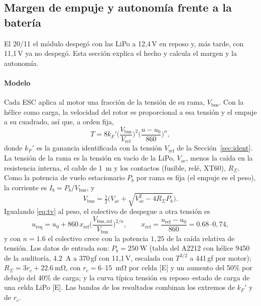 \subsection{Margen de empuje y autonomía frente a la batería}
\label{sec:bateria}

El 20/11 el módulo despegó con las LiPo a 12,4\,V en reposo y, más tarde, con 11,1\,V ya no despegó. Esta sección explica el hecho y calcula el margen y la autonomía.

\paragraph{Modelo}
Cada ESC aplica al motor una fracción de la tensión de su rama, $V_{\mathrm{bus}}$. Con la hélice como carga, la velocidad del rotor es proporcional a esa tensión y el empuje a su cuadrado, así que, a orden fija,
\begin{equation}
  T=8k_F'\Big(\frac{V_{\mathrm{bus}}}{V_{\mathrm{ref}}}\Big)^2\Big(\frac{u-u_0}{860}\Big)^n ,
  \label{eq:tv}
\end{equation}
donde $k_F'$ es la ganancia identificada con la tensión $V_{\mathrm{ref}}$ de la Sección~\ref{sec:ident}. La tensión de la rama es la tensión en vacío de la LiPo, $V_{oc}$, menos la caída en la resistencia interna, el cable de \SI{1}{\metre} y los contactos (fusible, relé, XT60), $R_\Sigma$. Como la potencia de vuelo estacionario $P_b$ por rama es fija (el empuje es el peso), la corriente es $I_b=P_b/V_{\mathrm{bus}}$, y
\begin{equation}
  V_{\mathrm{bus}}=\tfrac12\Big(V_{oc}+\sqrt{V_{oc}^2-4R_\Sigma P_b}\Big).
  \label{eq:vbus}
\end{equation}
Igualando \eqref{eq:tv} al peso, el colectivo de despegue a otra tensión es
\begin{equation}
  u_{\mathrm{req}}=u_0+860\,x_{\mathrm{ref}}\Big(\frac{V_{\mathrm{bus,ref}}}{V_{\mathrm{bus}}}\Big)^{2/n},\qquad x_{\mathrm{ref}}=\frac{u_{\mathrm{ref}}-u_0}{860}=0.68\text{--}0{,}74,
  \label{eq:ureq}
\end{equation}
y con $n=1.6$ el colectivo crece con la potencia $1{,}25$ de la caída relativa de tensión. Los datos de entrada son: $P_b=\SI{250}{\watt}$ (tabla del A2212 con hélice 9450 de la auditoría, \SI{4.2}{\ampere} a 370\,gf con 11,1\,V, escalada con $T^{3/2}$ a 441\,gf por motor); $R_\Sigma=3r_c+\SI{22.6}{\milli\ohm}$, con $r_c=6$--\SI{15}{\milli\ohm} por celda [E] y un aumento del 50\% por debajo del 40\% de carga; y la curva típica tensión en reposo--estado de carga de una celda LiPo [E]. Las bandas de los resultados combinan los extremos de $k_F'$ y de $r_c$.

